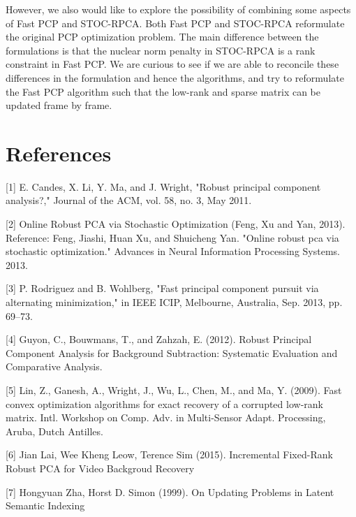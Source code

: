 \documentclass[oneside]{article}
\begin{document}
\newline\newline
However, we also would like to explore the possibility of combining some aspects of Fast PCP and STOC-RPCA. Both Fast PCP and STOC-RPCA reformulate the original PCP optimization problem. The main difference between the formulations is that the nuclear norm penalty in STOC-RPCA is a rank constraint in Fast PCP. We are curious to see if we are able to reconcile these differences in the formulation and hence the algorithms, and try to reformulate the Fast PCP algorithm such that the low-rank and sparse matrix can be updated frame by frame.

\section{References}
[1] \hspace*{8pt} E. Candes, X. Li, Y. Ma, and J. Wright, "Robust principal component analysis?," Journal of the ACM, vol. 58,
no. 3, May 2011.

[2] \hspace*{8pt}Online Robust PCA via Stochastic Optimization	(Feng, Xu and Yan, 2013). Reference: Feng, Jiashi, Huan Xu, and Shuicheng Yan. "Online robust pca via stochastic optimization." Advances in Neural Information Processing Systems. 2013.

[3] \hspace*{8pt}P. Rodriguez and B. Wohlberg, "Fast principal component pursuit via alternating minimization," in IEEE ICIP, Melbourne, Australia, Sep. 2013, pp. 69–73.

[4] \hspace*{8pt}Guyon, C., Bouwmans, T., and Zahzah, E. (2012). Robust Principal Component Analysis for Background Subtraction: Systematic Evaluation and Comparative Analysis.

[5] \hspace*{8pt}Lin, Z., Ganesh, A., Wright, J., Wu, L., Chen, M., and Ma, Y. (2009). Fast convex optimization algorithms for exact recovery of a corrupted low-rank matrix. Intl. Workshop on Comp. Adv. in Multi-Sensor Adapt. Processing, Aruba, Dutch Antilles.

[6] \hspace*{8pt}Jian Lai, Wee Kheng Leow, Terence Sim (2015). Incremental Fixed-Rank Robust PCA for Video Backgroud Recovery

[7] \hspace*{8pt}Hongyuan Zha, Horst D. Simon (1999). On Updating Problems in Latent Semantic Indexing
\end{document}
